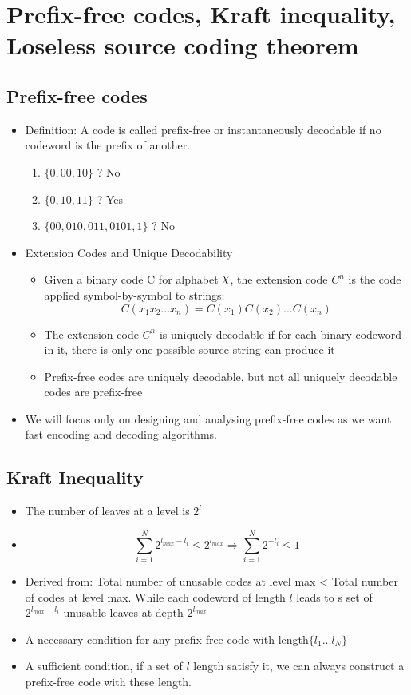 \documentclass[24pt]{article}
\DeclareRobustCommand{\rchi}{{\mathpalette\irchi\relax}}
\newcommand{\irchi}[2]{\raisebox{\depth}{$#1\chi$}} %
\begin{document}
\section{Prefix-free codes, Kraft inequality, Loseless source coding theorem }
\subsection{Prefix-free codes}
\begin{itemize}
\item Definition: A code is called prefix-free or instantaneously decodable if no codeword is the prefix of another.
\begin{enumerate}
\item $\{0,00,10\}$ ? No
\item $\{0,10,11\}$ ? Yes
\item $\{00,010, 011,0101,1\}$ ? No

\end{enumerate}
\item Extension Codes and Unique Decodability
\begin{itemize}
\item Given a binary code C for alphabet $\rchi$, the extension code $C^n$ is the code applied symbol-by-symbol to strings:
$$C(x_1x_2...x_n) = C(x_1)C(x_2)...C(x_n)$$ 
\item The extension code $C^n$ is uniquely decodable if for each binary codeword in it, there is only one possible source string can produce it 
\item Prefix-free codes are uniquely decodable, but not all uniquely decodable codes are prefix-free
\end{itemize}
\item We will focus only on designing and analysing prefix-free codes as we want fast encoding and decoding algorithms.
\end{itemize}
\subsection{Kraft Inequality}
\begin{itemize}
\item The number of  leaves at a level is $2^l$
\item $$\sum_{i=1}^N 2^{\mathit{l}_{max} - \mathit{l}_i} \le 2^{\mathit{l}_{max}} \Rightarrow \sum_{i=1}^N 2^{ - \mathit{l}_i}  \le 1$$
\item Derived from: Total number of unusable codes at level max < Total number of codes at level max. While each codeword of length $\mathit{l}$ leads to s set of $2^{\mathit{l}_{max} - \mathit{l}_i}$ unusable leaves at depth $2^{\mathit{l}_{max}}$
\item A necessary condition for any prefix-free code with length$\{\mathit{l}_1...\mathit{l}_N \}$ 
\item A sufficient condition, if a set of $\mathit{l}$ length satisfy it, we can always construct a prefix-free code with these length.

\end{itemize}
\end{document}
